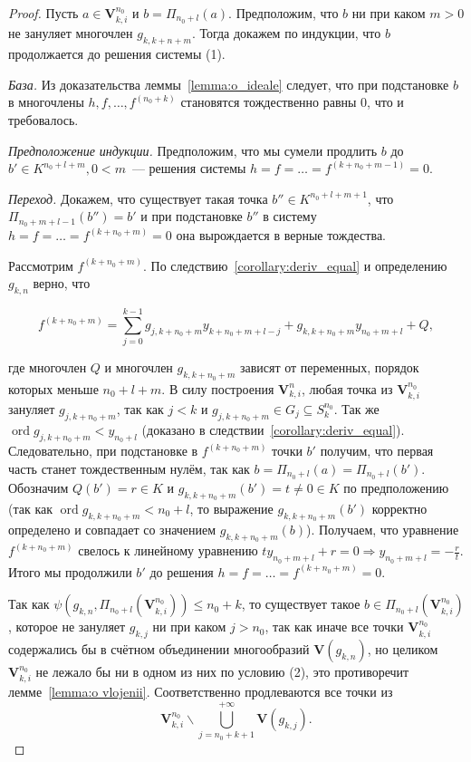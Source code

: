 \documentclass[16pt]{article}
\DeclareMathOperator{\ord}{ord}
\theoremstyle{plain1}
\theoremstyle{plain2}
\theoremstyle{plain}
\theoremstyle{plain3}
\theoremstyle{definition}
\theoremstyle{remark}
\begin{document}
\begin{proof}
Пусть $a\in \mathbf{V}_{k,i}^{n_0}$ и $b=\Pi_{n_0+l}(a)$. Предположим, что $b$ ни при каком $m>0$ не зануляет многочлен $g_{k,k+n+m}$. Тогда докажем по индукции, что $b$ продолжается до решения системы (1).

\emph{База.} Из доказательства леммы~\ref{lemma:o_ideale} следует, что при подстановке $b$ в многочлены $h,f,\ldots,f^{(n_0+k)}$ становятся тождественно равны 0, что и требовалось.

\emph{Предположение индукции.} Предположим, что мы сумели продлить $b$ до $b'\in K^{n_0+l+m}, 0< m$~--- решения системы $h=f=\ldots=f^{(k+n_0+m-1)}=0$.

\emph{Переход.} Докажем, что существует такая точка $b''\in K^{n_0+l+m+1}$, что $\Pi_{n_0+m+l-1}(b'')=b'$ и при подстановке $b''$ в систему $h=f=\ldots=f^{(k+n_0+m)}=0$ она вырождается в верные тождества.

Рассмотрим $f^{(k+n_0+m)}$. По следствию~\ref{corollary:deriv_equal} и определению $g_{k,n}$ верно, что

$$
f^{(k+n_0+m)}=\sum\limits_{j=0}^{k-1} g_{j,k+n_0+m}y_{k+n_0+m+l -j}+g_{k,k+n_0+m}y_{n_0+m+l}  + Q,
$$

где многочлен $Q$ и многочлен $g_{k,k+n_0+m}$ зависят от переменных, порядок которых меньше $n_0+l+m$. В силу построения $\mathbf{V}_{k,i}^n$, любая точка из $\mathbf{V}_{k,i}^{n_0}$ зануляет $g_{j,k+n_0+m}$, так как $j < k$ и $g_{j,k+n_0+m}\in G_j\subseteq S_k^{n_0}$. Так же $\ord g_{j,k+n_0+m}<y_{n_0+l}$ (доказано в следствии~\ref{corollary:deriv_equal}). Следовательно, при подстановке в $f^{(k+n_0+m)}$ точки $b'$ получим, что первая часть станет тождественным нулём, так как $b=\Pi_{n_0+l}(a)=\Pi_{n_0+l}(b')$. Обозначим $Q(b')=r\in K$ и $g_{k,k+n_0+m}(b')=t\neq 0\in K$ по предположению (так как $\ord g_{k,k+n_0+m}< n_0+l$, то выражение $g_{k,k+n_0+m}(b')$ корректно определено и совпадает со значением $g_{k,k+n_0+m}(b)$). Получаем, что уравнение $f^{(k+n_0+m)}$ свелось к линейному уравнению $t y_{n_0+m+l}+r=0\Rightarrow y_{n_0+m+l}=-\frac{r}{t}$. Итого мы продолжили $b'$ до решения $h=f=\ldots=f^{(k+n_0+m)}=0$.

 Так как $\psi(g_{k,n},\Pi_{n_0+l}(\mathbf{V}_{k,i}^{n_0}))\leqslant n_0+k$, то существует такое $b\in \Pi_{n_0+l}(\mathbf{V}_{k,i}^{n_0})$,  которое не зануляет $g_{k,j}$ ни при каком $j>n_0$, так как иначе все точки $\mathbf{V}_{k,i}^{n_0}$ содержались бы в счётном объединении многообразий $\mathbf{V}(g_{k,n})$, но целиком $\mathbf{V}_{k,i}^{n_0}$ не лежало бы ни в одном из них по условию (2), это противоречит лемме~\ref{lemma:o vlojenii}. Соответственно продлеваются все точки из $$\mathbf{V}_{k,i}^{n_0}\backslash \bigcup\limits_{j=n_0+k+1}^{+\infty}\mathbf{V}(g_{k,j}).$$
 \end{proof}
\end{document}
